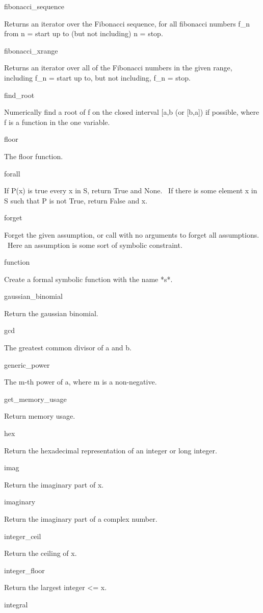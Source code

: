 \documentclass[12pt,twoside]{book}
\begin{document}
fibonacci\_sequence

Returns an iterator over the Fibonacci sequence, for all fibonacci
numbers f\_n from n = start up to (but not including) n = stop.

fibonacci\_xrange

Returns an iterator over all of the Fibonacci numbers in the given
range, including f\_n = start up to, but not including, f\_n = stop.

find\_root

Numerically find a root of f on the closed interval [a,b (or [b,a]) if
possible, where f is a function in the one variable.

floor

The floor function.

forall

If P(x) is true every x in S, return True and None. \ If there is some
element x in S such that P is not True, return False and x.

forget

Forget the given assumption, or call with no arguments to forget all
assumptions. \ Here an assumption is some sort of symbolic constraint.

function

Create a formal symbolic function with the name *s*.

gaussian\_binomial

Return the gaussian binomial.

gcd

The greatest common divisor of a and b.

generic\_power

The m{}-th power of a, where m is a non{}-negative.

get\_memory\_usage

Return memory usage.

hex

Return the hexadecimal representation of an integer or long integer.

imag

Return the imaginary part of x.

imaginary

Return the imaginary part of a complex number.

integer\_ceil

Return the ceiling of x.

integer\_floor

Return the largest integer {\textless}= x.

integral \ \ \ \ 
\end{document}
